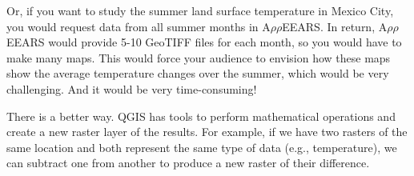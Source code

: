 \documentclass[oneside,a4paper,11pt,explicit]{book}
\begin{document}
Or, if you want to study the summer land surface temperature in Mexico City, you would request data from all summer months in A$\rho\rho$EEARS. In return, A$\rho\rho$EEARS would provide 5-10 GeoTIFF files for each month, so you would have to make many maps. This would force your audience to envision how these maps show the average temperature changes over the summer, which would be very challenging. And it would be very time-consuming! 

\vspace{.5em}

There is a better way. QGIS has tools to perform mathematical operations and create a new raster layer of the results. For example, if we have two rasters of the same location and both represent the same type of data (e.g., temperature), we can subtract one from another to produce a new raster of their difference. 
\end{document}
